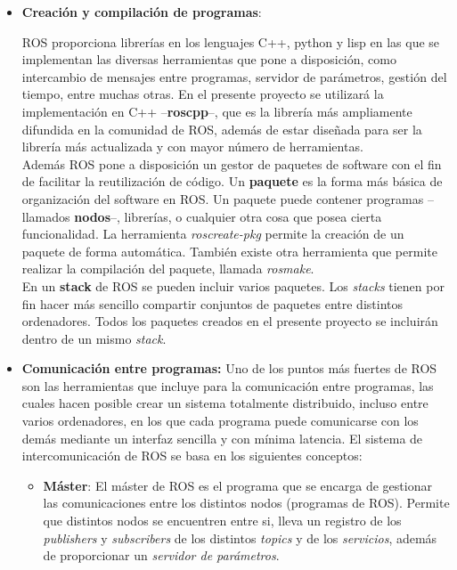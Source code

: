 \documentclass[12pt, a4paper]{report}
\begin{document}
\begin{itemize}

\item \textbf{Creación y compilación de programas}: 

ROS proporciona librerías en los lenguajes C++, python y lisp en las que se implementan las diversas herramientas que pone a disposición, como intercambio de mensajes entre programas, servidor de parámetros, gestión del tiempo, entre muchas otras. En el presente proyecto se utilizará la implementación en C++ --\textbf{roscpp}--, que es la librería más ampliamente difundida en la comunidad de ROS, además de estar diseñada para ser la librería más actualizada y con mayor número de herramientas.\\

Además ROS pone a disposición un gestor de paquetes de software con el fin de facilitar la reutilización de código. Un \textbf{paquete} es la forma más básica de organización del software en ROS. Un paquete puede contener programas --llamados \textbf{nodos}--, librerías, o cualquier otra cosa que posea cierta funcionalidad. La herramienta \textit{roscreate-pkg} permite la creación de un paquete de forma automática. También existe otra herramienta que permite realizar la compilación del paquete, llamada \textit{rosmake}.\\ 

En un \textbf{stack} de ROS se pueden incluir varios paquetes. Los \textit{stacks} tienen por fin hacer más sencillo compartir conjuntos de paquetes entre distintos ordenadores. Todos los paquetes creados en el presente proyecto se incluirán dentro de un mismo \textit{stack}.

\item \textbf{Comunicación entre programas:}
Uno de los puntos más fuertes de ROS son las herramientas que incluye para la comunicación entre programas, las cuales hacen posible crear un sistema totalmente distribuido, incluso entre varios ordenadores, en los que cada programa puede comunicarse con los demás mediante un interfaz sencilla y con mínima latencia. El sistema de intercomunicación de ROS se basa en los siguientes conceptos:

\begin{itemize}

\item \textbf{Máster}: El máster de ROS es el programa que se encarga de gestionar las comunicaciones entre los distintos nodos (programas de ROS). Permite que distintos nodos se encuentren entre si, lleva un registro de los \textit{publishers} y \textit{subscribers} de los distintos \textit{topics} y de los \textit{servicios}, además de proporcionar un \textit{servidor de parámetros}.


\end{itemize}
\end{itemize}
\end{document}
